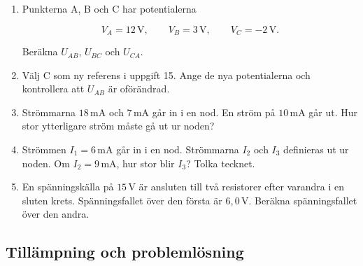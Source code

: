 \documentclass[
  swedish,
  11pt,
  a4paper,
  DIV=11,
  numbers=noendperiod,
  twoside,
  open=any]{scrreprt}
\begin{document}
\begin{enumerate}
\def\labelenumi{\arabic{enumi}.}
\setcounter{enumi}{14}
\item
  Punkterna A, B och C har potentialerna

  \[
  V_A = 12\,\mathrm{V},
  \qquad
  V_B = 3\,\mathrm{V},
  \qquad
  V_C = -2\,\mathrm{V}.
  \]

  Beräkna \(U_{AB}\), \(U_{BC}\) och \(U_{CA}\).
\item
  Välj C som ny referens i uppgift 15. Ange de nya potentialerna och
  kontrollera att \(U_{AB}\) är oförändrad.
\item
  Strömmarna \(18\,\mathrm{mA}\) och \(7\,\mathrm{mA}\) går in i en nod.
  En ström på \(10\,\mathrm{mA}\) går ut. Hur stor ytterligare ström
  måste gå ut ur noden?
\item
  Strömmen \(I_1 = 6\,\mathrm{mA}\) går in i en nod. Strömmarna \(I_2\)
  och \(I_3\) definieras ut ur noden. Om \(I_2 = 9\,\mathrm{mA}\), hur
  stor blir \(I_3\)? Tolka tecknet.
\item
  En spänningskälla på \(15\,\mathrm{V}\) är ansluten till två
  resistorer efter varandra i en sluten krets. Spänningsfallet över den
  första är \(6{,}0\,\mathrm{V}\). Beräkna spänningsfallet över den
  andra.
\end{enumerate}

\subsection{Tillämpning och
problemlösning}\label{sec-grunder-tillampning-och-problemlosning}
\end{document}
